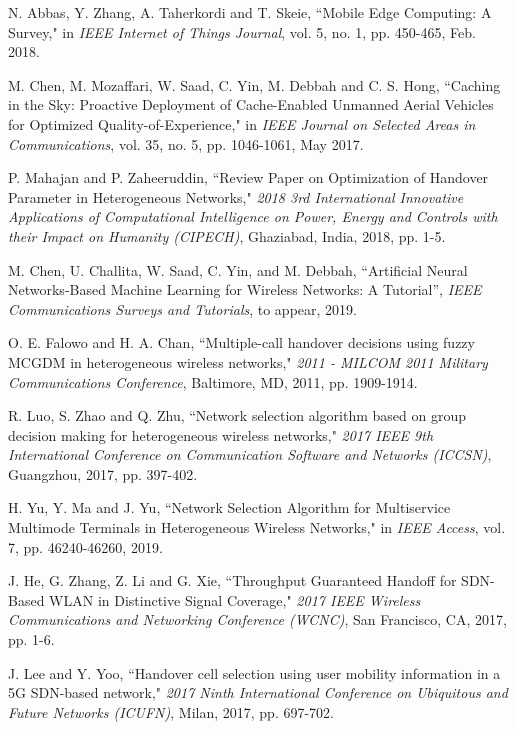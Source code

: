 \documentclass[conference]{IEEEtran}
\begin{document}
\def\baselinestretch{0.85}
\begin{thebibliography}{00}
	
 N. Abbas, Y. Zhang, A. Taherkordi and T. Skeie, ``Mobile Edge Computing: A Survey," in \emph{IEEE Internet of Things Journal}, vol. 5, no. 1, pp. 450-465, Feb. 2018.

 M. Chen, M. Mozaffari, W. Saad, C. Yin, M. Debbah and C. S. Hong, ``Caching in the Sky: Proactive Deployment of Cache-Enabled Unmanned Aerial Vehicles for Optimized Quality-of-Experience," in \emph{IEEE Journal on Selected Areas in Communications}, vol. 35, no. 5, pp. 1046-1061, May 2017.



	P. Mahajan and P. Zaheeruddin, ``Review Paper on Optimization of Handover Parameter in Heterogeneous Networks," \emph{2018 3rd International Innovative Applications of Computational Intelligence on Power, Energy and Controls with their Impact on Humanity (CIPECH)}, Ghaziabad, India, 2018, pp. 1-5.

  M. Chen, U. Challita, W. Saad, C. Yin, and M. Debbah, “Artificial Neural Networks-Based Machine Learning for Wireless Networks: A Tutorial”, \emph{IEEE Communications Surveys and Tutorials}, to appear, 2019. 

O. E. Falowo and H. A. Chan, ``Multiple-call handover decisions using fuzzy MCGDM in heterogeneous wireless networks," \emph{2011 - MILCOM 2011 Military Communications Conference}, Baltimore, MD, 2011, pp. 1909-1914.


R. Luo, S. Zhao and Q. Zhu, ``Network selection algorithm based on group decision making for heterogeneous wireless networks," \emph{2017 IEEE 9th International Conference on Communication Software and Networks (ICCSN)}, Guangzhou, 2017, pp. 397-402.

  H. Yu, Y. Ma and J. Yu,  ``Network Selection Algorithm for Multiservice Multimode Terminals in Heterogeneous Wireless Networks," in \emph{IEEE Access}, vol. 7, pp. 46240-46260, 2019.

J. He, G. Zhang, Z. Li and G. Xie, ``Throughput Guaranteed Handoff for SDN-Based WLAN in Distinctive Signal Coverage," \emph{2017 IEEE Wireless Communications and Networking Conference (WCNC)}, San Francisco, CA, 2017, pp. 1-6.

  J. Lee and Y. Yoo, ``Handover cell selection using user mobility information in a 5G SDN-based network," \emph{2017 Ninth International Conference on Ubiquitous and Future Networks (ICUFN)}, Milan, 2017, pp. 697-702.


\end{thebibliography}
\end{document}
